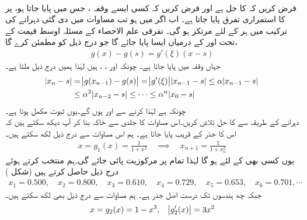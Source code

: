 \quad {}\\
فرض کریں کہ  کا حل  ہے اور فرض کریں کہ کسی ایسے وقفہ ، جس میں  پایا جاتا ہو، پر  کا استمراری تفرق پایا جاتا ہے۔ اب اگر  میں  ہو تب مساوات  میں دی گئی دہرانے کی ترکیب  میں ہر  کے لئے مرتکز ہو گی۔
\quad
تفرقی علم الاحصاء کے مسئلہ اوسط قیمت کے تحت  اور  کے درمیان ایسا  پایا جائے گا جو درج ذیل کو مطمئن کرے گا،
\begin{align*}
g(x)-g(s)=g'(\xi)(x-s) 
\end{align*}
جہاں  وقفہ  میں پایا جاتا ہے۔  چونکہ  اور ، ،  ہیں لہٰذا ہمیں درج ذیل ملتا ہے۔
\begin{align*}
\abs{x_n-s}&=\abs{g(x_{n-1})-g(s)}=\abs{g'(\xi)}\abs{x_{n-1}-s}\le \alpha \abs{x_{n-1}-s}\\
&\le \alpha^2\abs{x_{n-2}-s}\le \cdots \le \alpha^n\abs{x_{0}-s}
\end{align*}
چونکہ  ہے لہٰذا   کرنے سے  اور  ہوں گے۔یوں ثبوت مکمل ہوتا ہے۔
\quad {}\\
دہرانے کے طریقہ سے  کا حل  تلاش کریں۔اس مساوات کا جلدی سے خاکہ  بنا کر آپ دیکھ سکتے ہیں کہ اس کا جذر  کے قریب پایا جاتا ہے۔  ہم اس  مساوات سے درج ذیل لکھ سکتے ہیں۔
\begin{align*}
x=g_1(x)=\frac{1}{1+x^2}\quad \implies \quad x_{n+1}=\frac{1}{1+x_n^2}
\end{align*}
یوں کسی بھی  کے لئے  ہو گا لہٰذا تمام  پر مرکوزیت پائی جائے گی۔ہم  منتخب کرتے ہوئے درج ذیل حاصل کرتے ہیں (شکل )
\begin{align*}
x_1=0.500,\quad x_2=0.800,\quad x_3=0.610,\quad x_4=0.729,\quad x_5=0.653,\quad x_6=0.701,\cdots
\end{align*}
جبکہ چھ ہندسوں تک درست اصل جذر  ہے۔ ہم مساوات سے درج ذیل بھی لکھ سکتے ہیں۔
\begin{align*}
x=g_2(x)=1-x^3,\quad \abs{g_2'(x)}=3x^2 
\end{align*}
